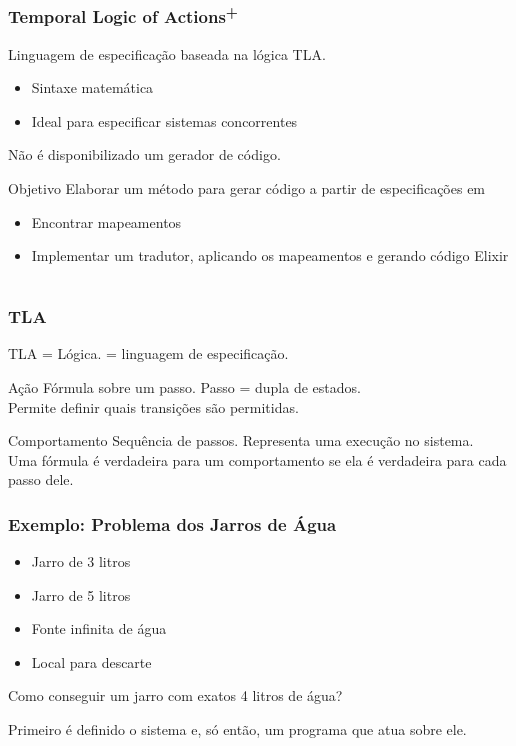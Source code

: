 \documentclass{beamer}
\begin{document}
\begin{frame}
  \frametitle{Temporal Logic of Actions\textsuperscript{+}}

  Linguagem de especificação baseada na lógica TLA.
  \begin{itemize}
    \item Sintaxe matemática
    \item Ideal para especificar sistemas concorrentes
  \end{itemize}\medskip

  Não é disponibilizado um gerador de código.\medskip\pause

  \begin{block}{Objetivo}
    Elaborar um método para gerar código a partir de especificações em \TLA
    \begin{itemize}
      \item Encontrar mapeamentos
      \item Implementar um tradutor, aplicando os mapeamentos e gerando código Elixir
    \end{itemize}
  \end{block}
\end{frame}

\section{\TLA}

\begin{frame}
  \frametitle{TLA}

  TLA = Lógica. \TLA = linguagem de especificação.\medskip

  \begin{block}{Ação}
    Fórmula sobre um passo. Passo = dupla de estados.\\\medskip
    Permite definir quais transições são permitidas.
  \end{block}

  \begin{block}{Comportamento}
    Sequência de passos. Representa uma execução no sistema.\\\medskip
    Uma fórmula é verdadeira para um comportamento se ela é verdadeira para cada passo dele.
  \end{block}

\end{frame}

\begin{frame}
  \frametitle{Exemplo: Problema dos Jarros de Água}

  \begin{itemize}
    \item Jarro de 3 litros
    \item Jarro de 5 litros
    \item Fonte infinita de água
    \item Local para descarte
  \end{itemize}\medskip

  Como conseguir um jarro com exatos 4 litros de água?\medskip

  Primeiro é definido o sistema e, só então, um programa que atua sobre ele.

\end{frame}
\end{document}
